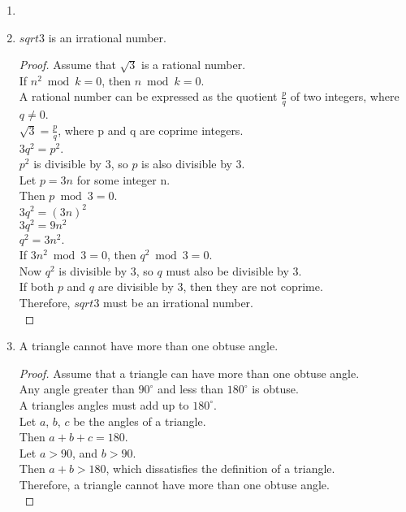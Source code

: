 \begin{enumerate}[leftmargin=2cm,labelsep=.5cm,label=\bf\arabic*.]
\item

\item
\begin{lemma}
$sqrt{3}$ is an irrational number.
\end{lemma}
\begin{proof}
Assume that $\sqrt{3}$ is a rational number.\\
If $n^2 \bmod k = 0$, then $n \bmod k = 0$.\\
A rational number can be expressed as the quotient $\frac{p}{q}$ of two integers, where $q\neq 0$.\\[2mm]
$\sqrt{3}=\frac{p}{q}$, where p and q are coprime integers.\\
$3q^2 = p^2$.\\
$p^2$ is divisible by $3$, so $p$ is also divisible by $3$.\\
Let $p=3n$ for some integer n.\\
Then $p \bmod 3 = 0$.\\
$3q^2 = (3n)^2$\\
$3q^2 = 9n^2$\\
$q^2 = 3n^2$.\\
If $3n^2 \bmod 3 = 0$, then $q^2 \bmod 3 = 0$.\\[2mm]
Now $q^2$ is divisible by $3$, so $q$ must also be divisible by $3$.\\
If both $p$ and $q$ are divisible by $3$, then they are not coprime.\\
Therefore, $sqrt{3}$ must be an irrational number.\\[5mm]
\end{proof}

\item
\begin{lemma}
A triangle cannot have more than one obtuse angle.
\end{lemma}
\begin{proof}
Assume that a triangle can have more than one obtuse angle.\\
Any angle greater than $90^{\circ}$ and less than $180^{\circ}$ is obtuse.\\
A triangles angles must add up to $180^{\circ}$.\\[2mm]
Let $a$, $b$, $c$ be the angles of a triangle.\\
Then $a + b + c = 180$.\\
Let $a > 90$, and $b > 90$.\\[2mm]
Then $a + b > 180$, which dissatisfies the definition of a triangle.\\
Therefore, a triangle cannot have more than one obtuse angle.\\[5mm]
\end{proof}


\end{enumerate}

